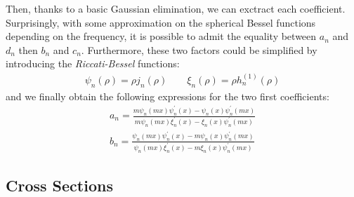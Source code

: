 \documentclass{article}
\numberwithin{equation}{section}
\begin{document}
Then, thanks to a basic Gaussian elimination, we can exctract each coefficient. Surprisingly, with some approximation on the spherical Bessel functions depending on the frequency, it is possible to admit the equality between $a_{n}$ and $d_{n}$ then $b_{n}$ and $c_{n}$. Furthermore, these two factors could be simplified by introducing the \textit{Riccati-Bessel} functions:
\begin{align}
\psi_{n}(\rho)=\rho j_{n}(\rho) \qquad \xi_{n}(\rho)=\rho h^{(1)}_{n}(\rho)
\end{align}
and we finally obtain the following expressions for the two first coefficients:
\begin{equation}\label{eq:an_bn}
\begin{aligned}
a_{n} = \frac{m\psi_{n}(mx)\psi^{'}_{n}(x)-\psi_{n}(x)\psi^{'}_{n}(mx)}{m\psi_{n}(mx)\xi^{'}_{n}(x)-\xi_{n}(x)\psi^{'}_{n}(mx)}\\
b_{n} = \frac{\psi_{n}(mx)\psi^{'}_{n}(x)-m\psi_{n}(x)\psi^{'}_{n}(mx)}{\psi_{n}(mx)\xi^{'}_{n}(x)-m\xi_{n}(x)\psi^{'}_{n}(mx)}
\end{aligned}
\end{equation}

\subsection{Cross Sections}
\end{document}
